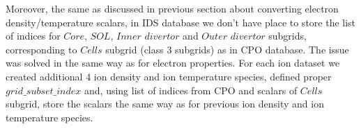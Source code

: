 \documentclass[a4paper,12pt,twoside]{article}
\begin{document}
Moreover, the same as discussed in previous section about converting electron \\ density/temperature scalars, in IDS database we don't have place to store the list of indices for $Core$, $SOL$, $Inner$ $divertor$ and $Outer$ $divertor$ subgrids, corresponding to $Cells$ subgrid (class 3 subgrids) as in CPO database. The issue was solved in the same way as for electron properties. For each ion dataset we created additional 4 ion density and ion temperature species, defined proper $grid\_subset\_index$ and, using list of indices from CPO and scalars of $Cells$ subgrid, store the scalars the same way as for previous ion density and ion temperature species.
\end{document}
